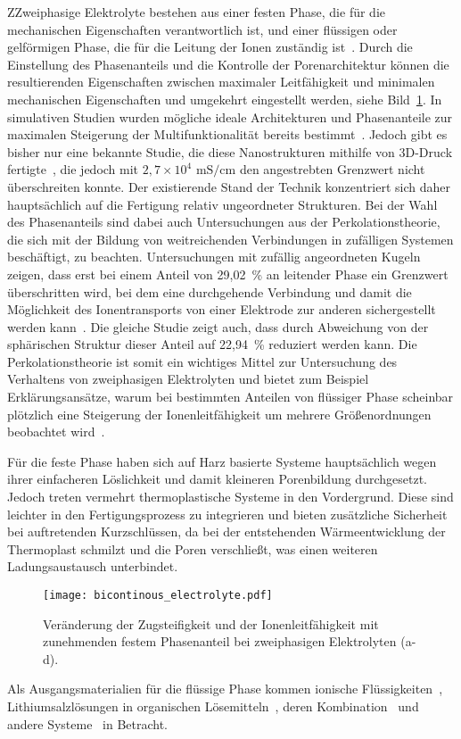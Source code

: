 ZZweiphasige Elektrolyte bestehen aus einer festen Phase, die für die mechanischen Eigenschaften verantwortlich ist, und einer flüssigen oder gelförmigen Phase, die für die Leitung der Ionen zuständig ist~\cite{Ichino1995}. Durch die Einstellung des Phasenanteils und die Kontrolle der Porenarchitektur können die resultierenden Eigenschaften zwischen maximaler Leitfähigkeit und minimalen mechanischen Eigenschaften und umgekehrt eingestellt werden, siehe Bild~\ref{fig:bicontinous_electrolyte}. In simulativen Studien wurden mögliche ideale Architekturen und Phasenanteile zur maximalen Steigerung der Multifunktionalität bereits bestimmt~\cite{Lee2019,Tu2020}. Jedoch gibt es bisher nur eine bekannte Studie, die diese Nanostrukturen mithilfe von 3D-Druck fertigte~\cite{Zekoll2018}, die jedoch mit $2,7 \times 10^4$ $\si{\milli \siemens \per \cm}$ den angestrebten Grenzwert nicht überschreiten konnte. Der existierende Stand der Technik konzentriert sich daher hauptsächlich auf die Fertigung relativ ungeordneter Strukturen. Bei der Wahl des Phasenanteils sind dabei auch Untersuchungen aus der Perkolationstheorie, die sich mit der Bildung von weitreichenden Verbindungen in zufälligen Systemen beschäftigt, zu beachten. Untersuchungen mit zufällig angeordneten Kugeln zeigen, dass erst bei einem Anteil von 29,02~\% an leitender Phase ein Grenzwert überschritten wird, bei dem eine durchgehende Verbindung und damit die Möglichkeit des Ionentransports von einer Elektrode zur anderen sichergestellt werden kann~\cite{Li2020b}. Die gleiche Studie zeigt auch, dass durch Abweichung von der sphärischen Struktur dieser Anteil auf 22,94~\% reduziert werden kann. Die Perkolationstheorie ist somit ein wichtiges Mittel zur Untersuchung des Verhaltens von zweiphasigen Elektrolyten und bietet zum Beispiel Erklärungsansätze, warum bei bestimmten Anteilen von flüssiger Phase scheinbar plötzlich eine Steigerung der Ionenleitfähigkeit um mehrere Größenordnungen beobachtet wird~\cite{Melodia2023}.

Für die feste Phase haben sich auf Harz basierte Systeme hauptsächlich wegen ihrer einfacheren Löslichkeit und damit kleineren Porenbildung durchgesetzt. Jedoch treten vermehrt thermoplastische Systeme in den Vordergrund. Diese sind leichter in den Fertigungsprozess zu integrieren und bieten zusätzliche Sicherheit bei auftretenden Kurzschlüssen, da bei der entstehenden Wärmeentwicklung der Thermoplast schmilzt und die Poren verschließt, was einen weiteren Ladungsaustausch unterbindet.
\begin{figure}[ht]
        \center
	\texttt{[image: bicontinous\_electrolyte.pdf]}
		\caption{\label{fig:bicontinous_electrolyte}Veränderung der Zugsteifigkeit und der Ionenleitfähigkeit mit zunehmenden festem Phasenanteil bei zweiphasigen Elektrolyten (a-d).}
\end{figure}
Als Ausgangsmaterialien für die flüssige Phase kommen ionische Flüssigkeiten~\cite{Huang2022,Shirshova2013,Wendong2021,Shirshova2014,Dzienia2020}, Lithiumsalzlösungen in organischen Lösemitteln~\cite{Gienger2015,Sakakibara2017}, deren Kombination~\cite{Shirshova2014,Yu2016} und andere Systeme~\cite{Feng2017} in Betracht.

